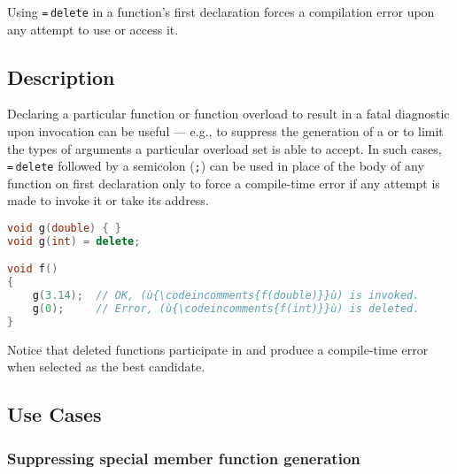 

Using \lstinline!=!\,\lstinline!delete! in a function's first declaration
forces a compilation error upon any attempt to use or access it.

\subsection[Description]{Description}\label{description}

Declaring a particular function or function overload to result in a
fatal diagnostic upon invocation can be useful --- e.g., to suppress the
generation of a  or to limit the types of
arguments a particular overload set is able to accept. In such cases,
\lstinline!=!\,\lstinline!delete! followed by a semicolon (\lstinline!;!) can be used in place of the body of any
function on first declaration only to force a compile-time error if
any attempt is made to invoke it or take its address.

\begin{lstlisting}[language=C++]
void g(double) { }
void g(int) = delete;

void f()
{
    g(3.14);  // OK, (ù{\codeincomments{f(double)}}ù) is invoked.
    g(0);     // Error, (ù{\codeincomments{f(int)}}ù) is deleted.
}
\end{lstlisting}
    
\noindent Notice that deleted functions participate in 
and produce a compile-time error when selected as the best candidate.

\subsection[Use Cases]{Use Cases}\label{use-cases}

\subsubsection[Suppressing special member function generation]{Suppressing special member function generation}\label{suppressing-special-member-function-generation}

